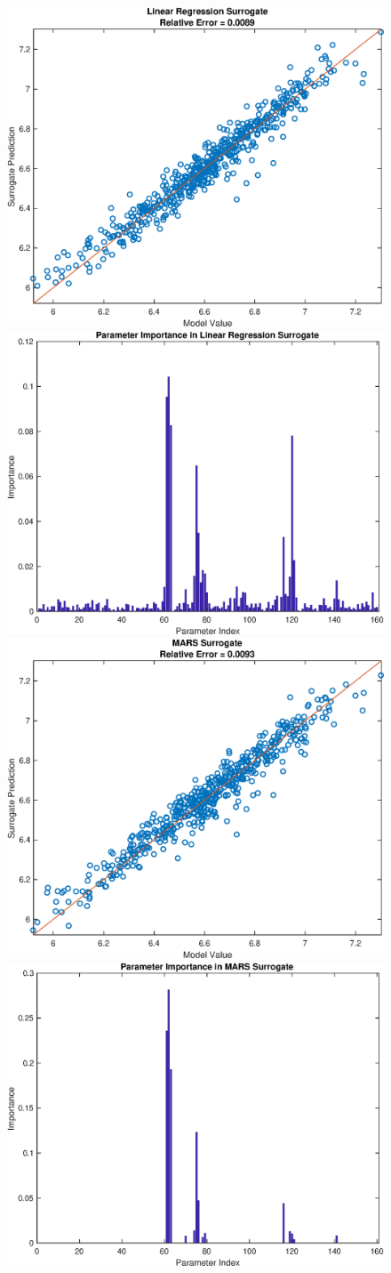 \documentclass[12pt]{article}
\numberwithin{equation}{section}
\begin{document}
\begin{figure}[h]
\centering
\includegraphics[width=.49 \textwidth]{Figures/K_ECS_Mean_QoI_LR_Prediction_Experimental.eps}
\includegraphics[width=.49 \textwidth]{Figures/K_ECS_Mean_QoI_LR_VI_Experimental.eps}\\
\includegraphics[width=.49 \textwidth]{Figures/K_ECS_Mean_QoI_MARS_Prediction_Experimental.eps}
\includegraphics[width=.49 \textwidth]{Figures/K_ECS_Mean_QoI_MARS_VI_Experimental.eps}
\end{figure}
\end{document}
